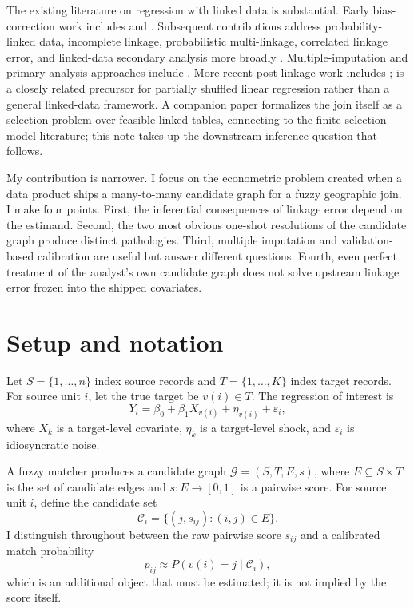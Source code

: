 \documentclass[12pt]{article}
\theoremstyle{remark}
\begin{document}
The existing literature on regression with linked data is substantial. Early bias-correction work includes \citet{scheuren1993,scheuren1997} and \citet{lahiri2005}. Subsequent contributions address probability-linked data, incomplete linkage, probabilistic multi-linkage, correlated linkage error, and linked-data secondary analysis more broadly \citep{chambers2009,kim2012multi,kim2012incomplete,kim2015,han2019,chambers2020,wang2022,doidge2019}. Multiple-imputation and primary-analysis approaches include \citet{goldstein2012,harron2014,hof2012,hof2015,hof2017,tancredi2011,tancredi2015,gutman2013,steorts2016,dalzell2018}. More recent post-linkage work includes \citet{slawski2025}; \citet{slawski2021} is a closely related precursor for partially shuffled linear regression rather than a general linked-data framework. A companion paper \citep{sood2025selection} formalizes the join itself as a selection problem over feasible linked tables, connecting to the finite selection model literature; this note takes up the downstream inference question that follows.

My contribution is narrower. I focus on the econometric problem created when a data product ships a many-to-many candidate graph for a fuzzy geographic join. I make four points. First, the inferential consequences of linkage error depend on the estimand. Second, the two most obvious one-shot resolutions of the candidate graph produce distinct pathologies. Third, multiple imputation and validation-based calibration are useful but answer different questions. Fourth, even perfect treatment of the analyst's own candidate graph does not solve upstream linkage error frozen into the shipped covariates.

\section{Setup and notation}

Let $S=\{1,\ldots,n\}$ index source records and $T=\{1,\ldots,K\}$ index target records. For source unit $i$, let the true target be $v(i)\in T$. The regression of interest is
\begin{equation}
Y_i=\beta_0+\beta_1 X_{v(i)}+\eta_{v(i)}+\varepsilon_i,
\label{eq:dgp}
\end{equation}
where $X_k$ is a target-level covariate, $\eta_k$ is a target-level shock, and $\varepsilon_i$ is idiosyncratic noise.

A fuzzy matcher produces a candidate graph $\mathcal G=(S,T,E,s)$, where $E\subseteq S\times T$ is the set of candidate edges and $s:E\to[0,1]$ is a pairwise score. For source unit $i$, define the candidate set
\[
\mathcal C_i=\{(j,s_{ij}):(i,j)\in E\}.
\]
I distinguish throughout between the raw pairwise score $s_{ij}$ and a calibrated match probability
\[
p_{ij}\approx P(v(i)=j\mid \mathcal C_i),
\]
which is an additional object that must be estimated; it is not implied by the score itself.
\end{document}
